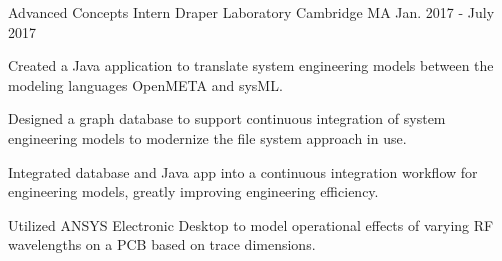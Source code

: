 \begin{cventries}
  \cventry
    {Advanced Concepts Intern} %
    {Draper Laboratory} %
    {Cambridge MA} %
    {Jan. 2017 - July 2017} %
    {
      \begin{cvitems} %
        \item {Created a Java application to translate system engineering models between the modeling languages OpenMETA and sysML.}
        \item {Designed a graph database to support continuous integration of system engineering models to modernize the file system approach in use.}
        \item {Integrated database and Java app into a continuous integration workflow for engineering models, greatly improving engineering efficiency.}
        \item {Utilized ANSYS Electronic Desktop to model operational effects of varying RF wavelengths on a PCB based on trace dimensions.}
      \end{cvitems}
    }

\end{cventries}
